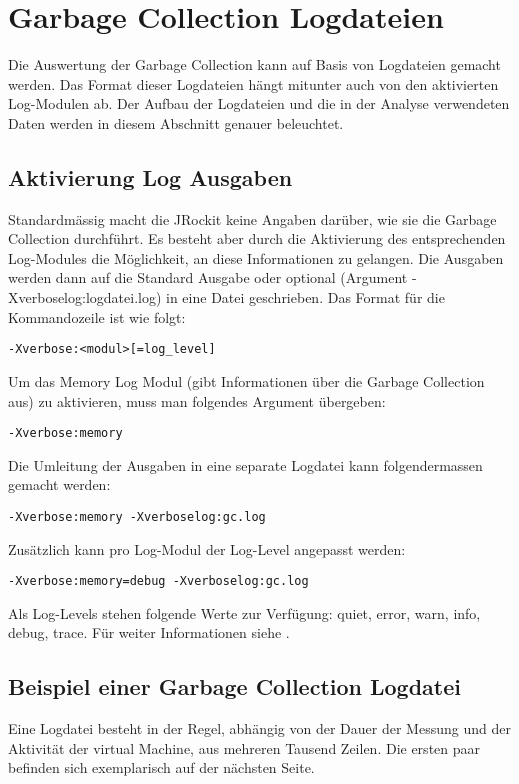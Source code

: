 \section{Garbage Collection Logdateien}\label{jrockitgclog}
Die Auswertung der Garbage Collection kann auf Basis von Logdateien gemacht werden. Das Format dieser Logdateien hängt mitunter auch von den aktivierten Log-Modulen ab. Der Aufbau der Logdateien und die in der Analyse verwendeten Daten werden in diesem Abschnitt genauer beleuchtet.

\subsection{Aktivierung Log Ausgaben}
Standardmässig macht die JRockit keine Angaben darüber, wie sie die Garbage Collection durchführt. Es besteht aber durch die Aktivierung des entsprechenden Log-Modules die Möglichkeit, an diese Informationen zu gelangen. Die Ausgaben werden dann auf die Standard Ausgabe oder optional (Argument -Xverboselog:logdatei.log) in eine Datei geschrieben. Das Format für die Kommandozeile ist wie folgt:

\begin{lstlisting}[caption=Format Aktivierung Log Modul]
-Xverbose:<modul>[=log_level]
\end{lstlisting}

Um das Memory Log Modul (gibt Informationen über die Garbage Collection aus) zu aktivieren, muss man folgendes Argument übergeben:
\begin{lstlisting}[caption=Garbage Collection Log (Info)]
-Xverbose:memory
\end{lstlisting}

Die Umleitung der Ausgaben in eine separate Logdatei kann folgendermassen gemacht werden:
\begin{lstlisting}[caption=Garbage Collection Log (Info) - Umleitung in gc.log]
-Xverbose:memory -Xverboselog:gc.log 
\end{lstlisting}


Zusätzlich kann pro Log-Modul der Log-Level angepasst werden:
\begin{lstlisting}[caption=Einstellung des Log-Levels]
-Xverbose:memory=debug -Xverboselog:gc.log 
\end{lstlisting}
Als Log-Levels stehen folgende Werte zur Verfügung: quiet, error, warn, info, debug, trace. Für weiter Informationen siehe \cite{oracleJRockitR28CLR}.

\subsection{Beispiel einer Garbage Collection Logdatei}
Eine Logdatei besteht in der Regel, abhängig von der Dauer der Messung und der Aktivität der virtual Machine, aus mehreren Tausend Zeilen. Die ersten paar befinden sich exemplarisch auf der nächsten Seite.

